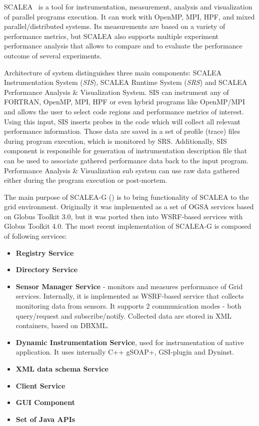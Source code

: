 SCALEA~\cite{SCALEA1} is a tool for instrumentation, measurement, analysis and visualization of parallel programs execution. It can work with OpenMP, MPI, HPF, and mixed parallel/distributed systems. Its measurements are based on a variety of performance metrics, but SCALEA also supports multiple experiment performance analysis that allows to compare and to evaluate the performance outcome of several experiments.

Architecture of system distinguishes three main components: SCALEA Instrumentation System (\emph{SIS}), SCALEA Runtime System (\emph{SRS}) and SCALEA Performance Analysis \& Visualization System. SIS can instrument any of FORTRAN, OpenMP, MPI, HPF or even hybrid programs like OpenMP/MPI and allows the user to select code regions and performance metrics of interest. Using this input, SIS inserts probes in the code which will collect all relevant performance information. Those data are saved in a set of profile (trace) files during program execution, which is monitored by SRS. Additionally, SIS component is responsible for generation of instrumentation description file that can be used to associate gathered performance data back to the input program. Performance Analysis \& Visualization sub system can use raw data gathered either during the program execution or post-mortem.

The main purpose of SCALEA-G (\cite{SCALEA2, SCALEA3}) is to bring functionality of SCALEA to the grid environment. Originally it was implemented as a set of OGSA services based on Globus Toolkit 3.0, but it was ported then into WSRF-based services with Globus Toolkit 4.0. The most recent implementation of SCALEA-G is composed of following services:

\begin{itemize}

\item{ {\bf Registry Service}}

\item{ {\bf Directory Service}}

\item{ {\bf Sensor Manager Service} - monitors and measures performance of Grid services. Internally, it is implemented as WSRF-based service that collects monitoring data from sensors. It supports 2 communication modes - both query/request and subscribe/notify. Collected data are stored in XML containers, based on DBXML.}

\item{ {\bf Dynamic Instrumentation Service}, used for instrumentation of native application. It uses internally C++ gSOAP+, GSI-plugin and Dyninst.}

\item{ {\bf XML data schema Service}}

\item{ {\bf Client Service}}

\item{ {\bf GUI Component}}

\item{ {\bf Set of Java APIs}}

\end{itemize}

